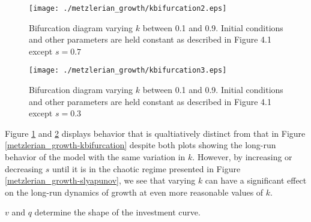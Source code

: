 \begin{figure}
    \centering
    \texttt{[image: ./metzlerian\_growth/kbifurcation2.eps]}
    \caption{Bifurcation diagram varying $k$ between 0.1 and 0.9. Initial conditions and other parameters are held constant as described in Figure 4.1 except $s=0.7$}
    \label{metzlerian_growth-kbifurcation2}
\end{figure}
\begin{figure}
    \centering
    \texttt{[image: ./metzlerian\_growth/kbifurcation3.eps]}
    \caption{Bifurcation diagram varying $k$ between 0.1 and 0.9. Initial conditions and other parameters are held constant as described in Figure 4.1 except $s=0.3$}
    \label{metzlerian_growth-kbifurcation3}
\end{figure}
Figure \ref{metzlerian_growth-kbifurcation2} and \ref{metzlerian_growth-kbifurcation3} displays behavior that is qualtiatively distinct from that in Figure \ref{metzlerian_growth-kbifurcation} despite both plots showing the long-run behavior of the model with the same variation in $k$. However, by increasing or decreasing $s$ until it is in the chaotic regime presented in Figure \ref{metzlerian_growth-slyapunov}, we see that varying $k$ can have a significant effect on the long-run dynamics of growth at even more reasonable values of $k$.

$v$ and $q$ determine the shape of the investment curve.

